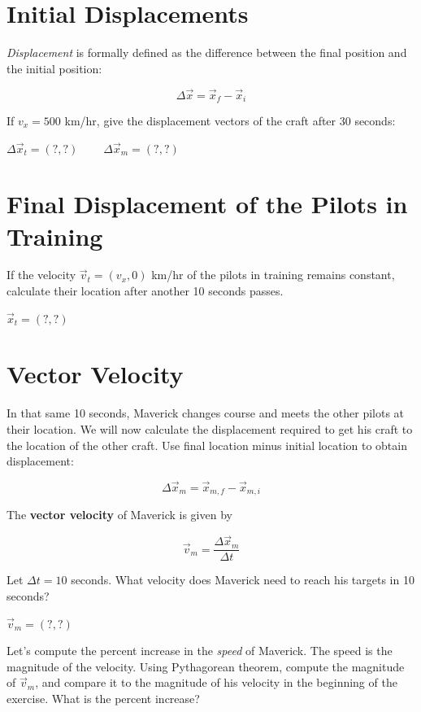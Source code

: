 \documentclass{article}
\begin{document}
\section{Initial Displacements}

\textit{Displacement} is formally defined as the difference between the final position and the initial position:

\begin{equation}
\Delta \vec{x} = \vec{x}_f - \vec{x}_i
\end{equation}

If $v_x = 500$ km/hr, give the displacement vectors of the craft after 30 seconds: \\ \vspace{1cm}

$\Delta \vec{x}_t = (?,?)~~~~~~~~~~\Delta \vec{x}_m = (?,?)$

\section{Final Displacement of the Pilots in Training}

If the velocity $\vec{v}_t = (v_x,0)$ km/hr of the pilots in training remains constant, calculate their location after another 10 seconds passes.  \\ \vspace{1cm}

$\vec{x}_t = (?,?)$

\section{Vector Velocity}

In that same 10 seconds, Maverick changes course and meets the other pilots at their location.  We will now calculate the displacement required to get his craft to the location of the other craft.  Use final location minus initial location to obtain displacement:

\begin{equation}
\Delta \vec{x}_m = \vec{x}_{m,f} - \vec{x}_{m,i}
\end{equation}

The \textbf{vector velocity} of Maverick is given by 

\begin{equation}
\vec{v}_m = \frac{\Delta \vec{x}_m}{\Delta t}
\end{equation}

Let $\Delta t = 10$ seconds.  What velocity does Maverick need to reach his targets in 10 seconds? \\ \vspace{2cm}

$\vec{v}_m = (?,?)$ \\ \vspace{2cm}

Let's compute the percent increase in the \textit{speed} of Maverick.  The speed is the magnitude of the velocity.  Using Pythagorean theorem, compute the magnitude of $\vec{v}_m$, and compare it to the magnitude of his velocity in the beginning of the exercise.  What is the percent increase?
\end{document}
